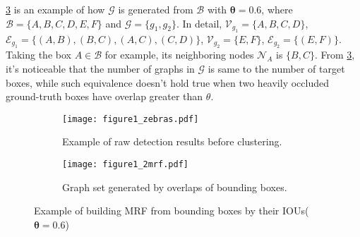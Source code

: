 \documentclass[10pt,twocolumn,letterpaper]{article}
\begin{document}
\cref{fig:box_graph} is an example of how $\mathcal{G}$ is generated from $\mathcal{B}$ with $\mathbf{\theta}=0.6$, where $\mathcal{B}=\{A,B,C,D,E,F\}$ and $\mathcal{G}=\{g_1,g_2\}$.
In detail, $\mathcal{V}_{g_{1}} = \{A,B,C,D\}$, $\mathcal{E}_{g_{1}} = \{(A,B),(B,C),(A,C),(C,D)\}$, $\mathcal{V}_{g_{2}} = \{E,F\}$, $\mathcal{E}_{g_{2}} = \{(E,F)\}$.
Taking the box $A\in\mathcal{B}$ for example, its neighboring nodes $\mathcal{N}_{A}$ is $\{B,C\}$.
From \cref{fig:box_graph}, it's noticeable that the number of graphs in $\mathcal{G}$ is same to the number of target boxes, while such equivalence doesn't hold true when two heavily occluded ground-truth boxes have overlap greater than $\theta$.

\begin{figure}[h!]
  \centering
  \begin{subfigure}[b]{0.8\linewidth}
    \label{fig:sub_fig1a}
    \texttt{[image: figure1\_zebras.pdf]}
    \caption{Example of raw detection results before clustering.}
  \end{subfigure}
  \begin{subfigure}[b]{0.8\linewidth}
    \label{fig:sub_fig1b}
    \texttt{[image: figure1\_2mrf.pdf]}
    \caption{Graph set generated by overlaps of bounding boxes.}
  \end{subfigure}
  \caption{Example of building MRF from bounding boxes by their IOUs($\mathbf{\theta}=0.6$)}
  \label{fig:box_graph}
\end{figure}
\end{document}
